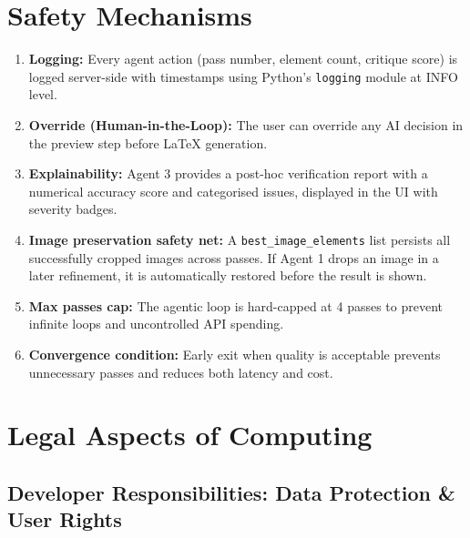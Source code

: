 \documentclass[12pt,a4paper]{article}
\begin{document}
\section{Safety Mechanisms}

\begin{enumerate}[noitemsep]
  \item \textbf{Logging:} Every agent action (pass number, element count, critique score) is
    logged server-side with timestamps using Python's \texttt{logging} module at INFO level.

  \item \textbf{Override (Human-in-the-Loop):} The user can override any AI decision in the
    preview step before LaTeX generation.

  \item \textbf{Explainability:} Agent 3 provides a post-hoc verification report with a
    numerical accuracy score and categorised issues, displayed in the UI with severity badges.

  \item \textbf{Image preservation safety net:} A \texttt{best\_image\_elements} list persists
    all successfully cropped images across passes. If Agent 1 drops an image in a later
    refinement, it is automatically restored before the result is shown.

  \item \textbf{Max passes cap:} The agentic loop is hard-capped at 4 passes to prevent
    infinite loops and uncontrolled API spending.

  \item \textbf{Convergence condition:} Early exit when quality is acceptable prevents
    unnecessary passes and reduces both latency and cost.
\end{enumerate}


\section{Legal Aspects of Computing}

\subsection{Developer Responsibilities: Data Protection \& User Rights}
\end{document}

